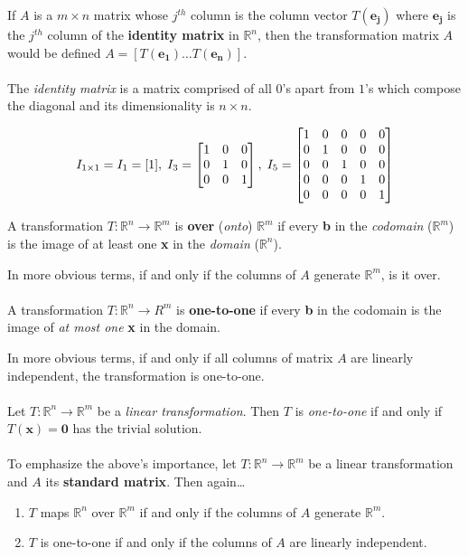 \documentclass[12pt]{article}
\newcommand{\R}{\mathbb{R}}
\newcommand{\bt}[1]{\textbf{{#1}}}
\newcommand{\bm}[1]{\mathbf{{#1}}}
\newcommand{\mb}{\begin{bmatrix}}
\newcommand{\me}{\end{bmatrix}}
\begin{document}
If $A$ is a $m \times n$ matrix whose $j^{th}$ column is the column vector $T(\bm{e_j})$ where $\bm{e_j}$ is the $j^{th}$
column of the \bt{identity matrix} in $\R^n$, then the transformation matrix $A$ would be defined $A = [T(\bm{e_1})\dots T(\bm{e_n})]$. \\ \\

The \emph{identity matrix} is a matrix comprised of all $0$'s apart from $1$'s which compose the diagonal and its dimensionality is $n \times n$.

$$I_{1 \times 1} = I_1 = [1], \;  I_3 = \mb 1 & 0 & 0 \\ 0 & 1 & 0 \\ 0 & 0 & 1 \me \\, \; I_5 = \mb 1 & 0 & 0 & 0 & 0 \\ 0 & 1 & 0 & 0 & 0 \\ 0 & 0 & 1 & 0 & 0 \\ 0 & 0 & 0 & 1 & 0 \\ 0 & 0 & 0 & 0 & 1 \me$$

A transformation $T: \R^n \rightarrow \R^m$ is \bt{over} (\emph{onto}) $\R^m$ if every \bt{b} in the \emph{codomain} ($\R^m$) is the
image of at least one \bt{x} in the \emph{domain} ($\R^n$).

In more obvious terms, if and only if the columns of $A$ generate $\R^m$, is it over. \\ \\

A transformation $T: \R^n \rightarrow R^m$ is \bt{one-to-one} if every \bt{b} in the codomain is the
image of \emph{at most one} \bt{x} in the domain.

In more obvious terms, if and only if all columns of matrix $A$ are linearly independent, the transformation is one-to-one. \\ \\

Let $T: \R^n \rightarrow \R^m$ be a \emph{linear transformation}. Then $T$ is \emph{one-to-one} if and only if
$T(\bm{x}) = \bm{0}$ has the trivial solution. \\ \\

To emphasize the above's importance, let $T: \R^n \rightarrow \R^m$ be a linear transformation and $A$ its \bt{standard matrix}. Then again\dots

\begin{enumerate}
    \item $T$ maps $\R^n$ over $\R^m$ if and only if the columns of $A$ generate $\R^m$.
    \item $T$ is one-to-one if and only if the columns of $A$ are linearly independent.
\end{enumerate}
\end{document}
